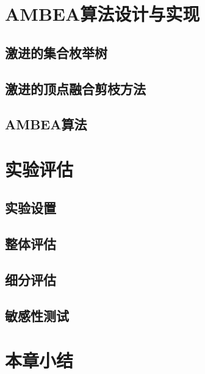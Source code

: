 \section{AMBEA算法设计与实现}

\subsection{激进的集合枚举树}

\subsection{激进的顶点融合剪枝方法}

\subsection{AMBEA算法}

\section{实验评估}

\subsection{实验设置}

\subsection{整体评估}
\label{subsec:ambea_exp_overall}

\subsection{细分评估}

\subsection{敏感性测试}

\section{本章小结}